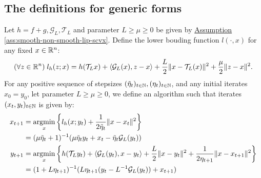 \documentclass[12pt]{article}
\begin{document}
    \subsection{The definitions for generic forms}
        \newcommand{\SCPPMAPG}{SC PPM APG}
        \begin{definition}[\SCPPMAPG]\label{def:SC-PPM-APG}
            
            Let $h = f + g, \mathcal G_L, \mathcal T_L$ and parameter $L \ge \mu \ge 0$ be given by
            \hyperref[ass:smooth-non-smooth-lip-scvx]
            {Assumption \ref*{ass:smooth-non-smooth-lip-scvx}}. 
            Define the lower bouding function $l(\cdot, x)$ for any fixed $x \in \mathbb R^n$: 
            \begin{align*}
                (\forall z \in \mathbb R^n) \; l_h(z; x) = h(\mathcal T_L x) + \langle \mathcal G_L (x), z - x\rangle
                + 
                \frac{L}{2}\Vert x - \mathcal T_L (x)\Vert^2 + \frac{\mu}{2}\Vert z - x\Vert^2. 
            \end{align*}
            For any positive sequence of stepsizes $(\tilde \eta_t)_{t \in \mathbb N}, (\eta_t)_{t \in \mathbb N}$, and any initial iterates $x_0 = y_0$, let parameter $L \ge \mu \ge 0$, we define an algorithm such that iterates $(x_t, y_t)_{t \in \mathbb N}$ is given by: 
            \begin{align*}
                x_{t + 1} &= \mathop{\rm argmin}\limits_{x} \left\lbrace
                l_h(x; y_t) + \frac{1}{2\tilde \eta_{t}} 
                \Vert x - x_t\Vert^2
                \right\rbrace
                \\
                &= (\mu\tilde \eta_{t} + 1)^{-1} 
                (\mu\tilde \eta_{t}y_t + x_t - \tilde \eta_{t}\mathcal G_L(y_t))
                \\
                y_{t + 1}&= 
                \mathop{\rm argmin}\limits_{x}
                \left\lbrace
                    h(\mathcal T_L y_t) + \langle \mathcal G_L(y_t), x - y_t\rangle + \frac{L}{2}\Vert x -y_t\Vert^2
                    + \frac{1}{2\eta_{t + 1}}\Vert x - x_{t + 1}\Vert^2
                \right\rbrace
                \\
                &= (1 + L \eta_{t +1})^{-1}(L\eta_{t + 1}(y_t - L^{-1}\mathcal G_L(y_t)) + x_{t + 1})
            \end{align*}
        \end{definition}
\end{document}
